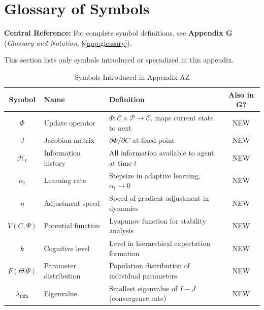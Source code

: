 \section{Glossary of Symbols}
\label{sec:az-glossary}

\begin{tcolorbox}[colback=blue!5!white, colframe=blue!75!black]
\textbf{Central Reference:} For complete symbol definitions, see
\textbf{Appendix G} (\textit{Glossary and Notation}, \S\ref{app:glossary}).

This section lists only symbols introduced or specialized in this appendix.
\end{tcolorbox}

\vspace{0.5em}

\begin{table}[htbp]
\centering
\caption{Symbols Introduced in Appendix AZ}
\label{tab:az-symbols}
\renewcommand{\arraystretch}{1.3}
\begin{tabular}{@{}clp{6cm}c@{}}
\toprule
\textbf{Symbol} & \textbf{Name} & \textbf{Definition} & \textbf{Also in G?} \\
\midrule
$\Phi$ & Update operator & $\Phi: \mathcal{C} \times \mathcal{P} \to \mathcal{C}$, maps current state to next & NEW \\
$J$ & Jacobian matrix & $\partial \Phi / \partial C$ at fixed point & NEW \\
$\mathcal{H}_t$ & Information history & All information available to agent at time $t$ & NEW \\
$\alpha_t$ & Learning rate & Stepsize in adaptive learning, $\alpha_t \to 0$ & NEW \\
$\eta$ & Adjustment speed & Speed of gradient adjustment in dynamics & NEW \\
$V(C, \Psi)$ & Potential function & Lyapunov function for stability analysis & NEW \\
$k$ & Cognitive level & Level in hierarchical expectation formation & NEW \\
$F(\Theta | \Psi)$ & Parameter distribution & Population distribution of individual parameters & NEW \\
$\lambda_{\min}$ & Eigenvalue & Smallest eigenvalue of $I - J$ (convergence rate) & NEW \\
\bottomrule
\end{tabular}
\end{table}



